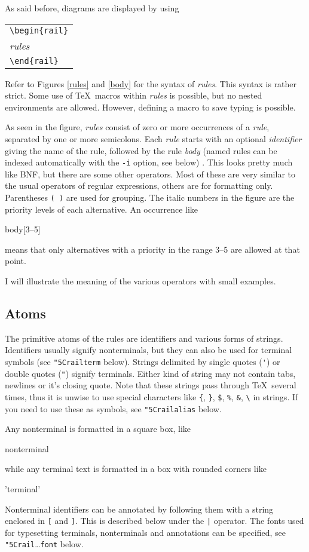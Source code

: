 \documentclass[a4paper]{article}
\newcommand\nt[1]{\textit{#1}}
\newcommand\lit[1]{\texttt{#1}}
\newcommand\cs[1]{\lit{\char"5C\relax#1}}
\newenvironment{example}%
{\begin{trivlist}\item[]\begin{tabular}{l}}%
{\end{tabular}\end{trivlist}}
\begin{document}
As said before, diagrams are displayed by using
\begin{example}
\verb!\begin{rail}! \\
\nt{rules} \\
\verb!\end{rail}!
\end{example}
Refer to Figures \ref{rules} and \ref{body} for the syntax of \nt{rules}.
This syntax is rather strict. Some use of \TeX\ macros within \nt{rules}
is possible, but no nested environments are allowed. However, defining a
macro to save typing is possible.

As seen in the figure, \nt{rules} consist of zero or more occurrences of a
\nt{rule}, separated by one or more semicolons. Each \nt{rule}
starts with an optional \nt{identifier} giving the name of the rule,
followed by the rule \nt{body} (named rules can be indexed
automatically with the \lit{-i} option, see below) .
This looks pretty much like BNF, but
there are some other operators. Most of these are very similar to the usual
operators of regular expressions, others are for formatting only.
Parentheses \verb!( )! are used for grouping. The italic numbers in the
figure are the priority levels of each alternative. An occurrence like
\begin{rail}
body[3--5]
\end{rail}
means that only alternatives with a priority in the range 3--5 are
allowed at that point.

I will illustrate the meaning of the various operators with small
examples.

\subsection{Atoms}

The primitive atoms of the rules are identifiers and various forms of strings.
Identifiers usually signify nonterminals, but they can also be used for
terminal symbols (see \cs{railterm} below).
Strings delimited by single quotes (\verb!'!) or double quotes
(\verb!"!) signify terminals. Either kind of string may not contain
tabs, newlines or it's closing quote. Note that these
strings pass through \TeX\ several times, thus it is unwise to use
special characters like \verb!{!, \verb!}!, \verb!$!, \verb!%!,
\verb!&!, \verb!\! in strings.
If you need to use these as symbols, see \cs{railalias} below.

Any nonterminal is formatted in a square box, like
\begin{rail}
nonterminal
\end{rail}
while any terminal text is formatted in a box with rounded corners like
\begin{rail}
'terminal'
\end{rail}
Nonterminal identifiers can be annotated by following them with a string
enclosed in \verb![! and \verb!]!. This is described below under the
\verb!|! operator. The fonts used for typesetting terminals,
nonterminals and annotations can be specified,
see \cs{rail}\ldots\lit{font} below.
\end{document}
